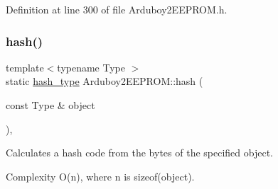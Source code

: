 Definition at line 300 of file Arduboy2\+E\+E\+P\+R\+O\+M.\+h.

\mbox{\label{classArduboy2EEPROM_a1eb431b4eb962bbd5fe1b18d7ac2af21}} 
\subsubsection{\texorpdfstring{hash()}{hash()}\hspace{0.1cm}{\footnotesize\ttfamily [2/2]}}
{\footnotesize\ttfamily template$<$typename Type $>$ \\
static \mbox{\hyperlink{classArduboy2EEPROM_a6221853153af216c0d6087f1e1455cd7}{hash\+\_\+type}} Arduboy2\+E\+E\+P\+R\+O\+M\+::hash (\begin{DoxyParamCaption}\item[{const Type \&}]{object }\end{DoxyParamCaption})\hspace{0.3cm}{\ttfamily [inline]}, {\ttfamily [static]}}



Calculates a hash code from the bytes of the specified object. 

\begin{DoxyParagraph}{Complexity}
{\ttfamily O(n)}, where {\ttfamily n} is {\ttfamily sizeof(object)}.
\end{DoxyParagraph}


